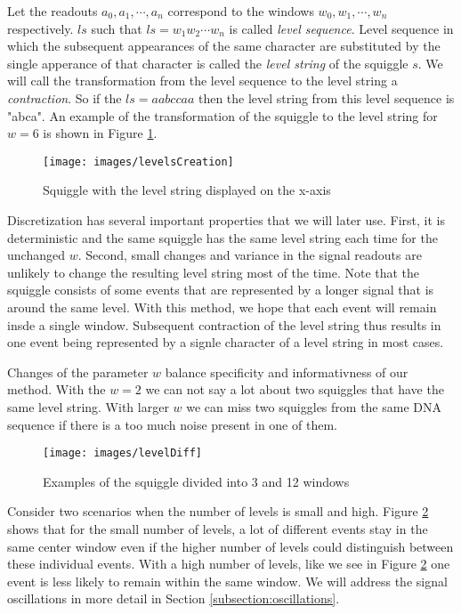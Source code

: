 Let the readouts $a_0, a_1, \cdots, a_n$ correspond to the windows $w_0, w_1, \cdots ,w_n$
respectively. $ls$ such that $ls=w_1w_2\cdots w_n$ is called \textit{level sequence}.
Level sequence in which the subsequent appearances of the same character are substituted
by the single apperance of that character is called the \textit{level string} of the squiggle $s$.
We will call the transformation from the level sequence to the level string a \textit{contraction}.
So if the $ls=aabccaa$ then the level string from this level sequence is "abca". An example of the transformation
of the squiggle to the level string for $w=6$ is shown in Figure \ref{obr:levelsCreation}.

\begin{figure}
\centerline{\texttt{[image: images/levelsCreation]}}
\caption[TODO]{Squiggle with the level string displayed on the x-axis}
\label{obr:levelsCreation}
\end{figure}

Discretization has several important properties that we will later use.
First, it is deterministic and the same squiggle has the same level
string each time for the unchanged $w$. Second, small changes and variance in the signal readouts
are unlikely to change the resulting level string most of the time. Note that the squiggle
consists of some events that are represented by a longer signal that is around the same level.
With this method, we hope that each event will remain insde a single window. Subsequent
contraction of the level string thus results in one event being represented by
a signle character of a level string in most cases.

Changes of the parameter $w$ balance specificity and informativness of our method.
With the $w=2$ we can not say a lot about two squiggles that have the same level string.
With larger $w$ we can miss two squiggles from the same DNA sequence if there is
a too much noise present in one of them.

\begin{figure}
\centerline{\texttt{[image: images/levelDiff]}}
\caption[TODO]{Examples of the squiggle divided into 3 and 12 windows}
\label{obr:levelDiff}
\end{figure}

Consider two scenarios when the number of levels is small and high.
Figure \ref{obr:levelDiff} shows that for the small number of levels, a lot of
different events stay in the same center window even if the higher number of levels
could distinguish between these individual events. With a high number of levels,
like we see in Figure \ref{obr:levelDiff} one event is less likely to remain within the same window.
We will address the signal oscillations in more detail in Section \ref{subsection:oscillations}.

